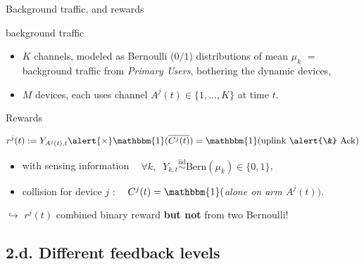\documentclass[12pt,english,ignorenonframetext,aspectratio=169,]{beamer}
\providecommand{\tightlist}{%
  \setlength{\itemsep}{0pt}\setlength{\parskip}{0pt}}
\begin{document}
\begin{frame}{Background traffic, and rewards}

\begin{block}{\iid{} background traffic}

\begin{itemize}
\tightlist
\item
  \(K\) channels, modeled as Bernoulli (\(0/1\)) distributions of mean
  \(\mu_k\) \(=\) background traffic from \emph{Primary Users},
  bothering the dynamic devices,
\item
  \(M\) devices, each uses channel \(A^j(t) \in \{1,\dots,K\}\) at time
  \(t\).
\end{itemize}

\end{block}

\begin{block}{Rewards}

\[r^j(t) := Y_{A^j(t),t} \alert{\times} \mathbbm{1}(\overline{C^j(t)}) = \mathbbm{1}(\text{uplink \alert{\&} Ack})\]

\begin{itemize}
\tightlist
\item
  with sensing information
  \(\;\;\)
  \(\forall k, \;\; Y_{k,t} \overset{\text{iid}}{\sim} \mathrm{Bern}(\mu_k) \in \{0, 1\}\),
  \item
  collision for device \(j\) :
  \(\;\;\)
  \(C^j(t) = \mathbbm{1}(\)\emph{alone on arm $A^j(t)$}\()\).
\end{itemize}
\(\hookrightarrow\) \(r^j(t)\) \alert{combined} binary reward \textbf{but not} from two Bernoulli!

\end{block}

\end{frame}



\subsection{\hfill{}2.d. Different feedback levels\hfill{}}
\end{document}
